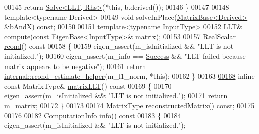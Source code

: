 \begin{DoxyCode}
00145       \textcolor{keywordflow}{return} \hyperlink{group___core___module_class_eigen_1_1_solve}{Solve<LLT, Rhs>}(*\textcolor{keyword}{this}, b.derived());
00146     \}
00147 
00148     \textcolor{keyword}{template}<\textcolor{keyword}{typename} Derived>
00149     \textcolor{keywordtype}{void} solveInPlace(\hyperlink{group___core___module_class_eigen_1_1_matrix_base}{MatrixBase<Derived>} &bAndX) \textcolor{keyword}{const};
00150 
00151     \textcolor{keyword}{template}<\textcolor{keyword}{typename} InputType>
00152     \hyperlink{group___cholesky___module_class_eigen_1_1_l_l_t}{LLT}& compute(\textcolor{keyword}{const} \hyperlink{group___core___module_struct_eigen_1_1_eigen_base}{EigenBase<InputType>}& matrix);
00153 
\hyperlink{group___cholesky___module_a59338fa78db171d02fd5a2c9e4f3a30c}{00157}     RealScalar \hyperlink{group___cholesky___module_a59338fa78db171d02fd5a2c9e4f3a30c}{rcond}()\textcolor{keyword}{ const}
00158 \textcolor{keyword}{    }\{
00159       eigen\_assert(m\_isInitialized && \textcolor{stringliteral}{"LLT is not initialized."});
00160       eigen\_assert(m\_info == \hyperlink{group__enums_gga85fad7b87587764e5cf6b513a9e0ee5ea52581b035f4b59c203b8ff999ef5fcea}{Success} && \textcolor{stringliteral}{"LLT failed because matrix appears to be negative"});
00161       \textcolor{keywordflow}{return} \hyperlink{namespace_eigen_1_1internal_ad1de0d785387bfb5435c410bf0554068}{internal::rcond\_estimate\_helper}(m\_l1\_norm, *\textcolor{keyword}{this});
00162     \}
00163 
\hyperlink{group___cholesky___module_af62881fc95c7e54a93b63c20f2c62b46}{00168}     \textcolor{keyword}{inline} \textcolor{keyword}{const} MatrixType& \hyperlink{group___cholesky___module_af62881fc95c7e54a93b63c20f2c62b46}{matrixLLT}()\textcolor{keyword}{ const}
00169 \textcolor{keyword}{    }\{
00170       eigen\_assert(m\_isInitialized && \textcolor{stringliteral}{"LLT is not initialized."});
00171       \textcolor{keywordflow}{return} m\_matrix;
00172     \}
00173 
00174     MatrixType reconstructedMatrix() \textcolor{keyword}{const};
00175 
00176 
\hyperlink{group___cholesky___module_adb1295e7d2b1fd825a041345ae08be54}{00182}     \hyperlink{group__enums_ga85fad7b87587764e5cf6b513a9e0ee5e}{ComputationInfo} \hyperlink{group___cholesky___module_adb1295e7d2b1fd825a041345ae08be54}{info}()\textcolor{keyword}{ const}
00183 \textcolor{keyword}{    }\{
00184       eigen\_assert(m\_isInitialized && \textcolor{stringliteral}{"LLT is not initialized."});

\end{DoxyCode}
